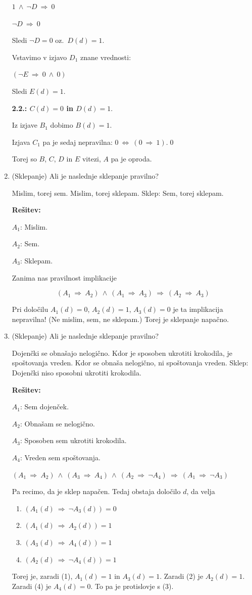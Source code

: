 \documentclass[11pt,paper=b5,footinclude,headinclude]{scrbook} %
\def\inn {{~\wedge~}}
\def\sledi {{~\Rightarrow~}}
\def\cee {{~\Leftrightarrow~}}
\theoremstyle{remark}
\theoremstyle{definition} %
\theoremstyle{theorem} %
\begin{document}
\begin{enumerate}
$1 \inn \neg D\sledi 0$

$\neg D\sledi 0$

Sledi $\neg D = 0$ oz.~$D(d) = 1$.

Vstavimo v izjavo $D_1$ znane vrednosti:

$(\neg E \sledi 0 \inn 0)$

Sledi $E(d) = 1$.

\bigskip

\textbf{2.2.: $C(d) = 0$ in $D(d) = 1$}.

Iz izjave $B_1$ dobimo $B(d) = 1$.

Izjava $C_1$ pa je sedaj nepravilna:
$0 \cee (0\sledi 1)$.\qed

Torej so $B$, $C$, $D$ in $E$ vitezi, $A$ pa je oproda.


\bigskip
\item (Sklepanje)
Ali je naslednje sklepanje pravilno?

Mislim, torej sem. Mislim, torej sklepam. Sklep: Sem, torej sklepam.


\textbf{Rešitev:}

$A_1$: Mislim.

$A_2$: Sem.

$A_3$: Sklepam.

Zanima nas pravilnost implikacije

$$(A_1\sledi A_2)\inn(A_1\sledi A_3)\sledi(A_2\sledi A_3)$$

Pri določilu $A_1(d) = 0$, $A_2(d) = 1$, $A_3(d) = 0$ je ta implikacija nepravilna!
(Ne mislim, sem, ne sklepam.)
Torej je sklepanje napačno.

\bigskip

\item (Sklepanje)
Ali je naslednje sklepanje pravilno?

Dojenčki se obnašajo nelogično. Kdor je sposoben ukrotiti krokodila, je spoštovanja vreden.
Kdor se obnaša nelogično, ni spoštovanja vreden. Sklep: Dojenčki niso sposobni ukrotiti krokodila.


\textbf{Rešitev:}

$A_1$: Sem dojenček.

$A_2$: Obnašam se nelogično.

$A_3$: Sposoben sem ukrotiti krokodila.

$A_4$: Vreden sem spoštovanja.

$(A_1\sledi A_2)\inn (A_3\sledi A_4) \inn (A_2\sledi \neg A_4)\sledi (A_1\sledi \neg A_3)$

Pa recimo, da je sklep napačen. Tedaj obstaja določilo $d$, da velja
\begin{enumerate}[(1)]
  \item $(A_1(d)\sledi \neg A_3(d)) = 0$
  \item $(A_1(d)\sledi A_2(d)) = 1$
  \item $(A_3(d)\sledi A_4(d)) = 1$
  \item $(A_2(d)\sledi \neg A_4(d)) = 1$
\end{enumerate}
Torej je, zaradi (1), $A_1(d) = 1$ in $A_3(d) = 1$. Zaradi (2) je $A_2(d) = 1$.
Zaradi (4) je $A_4(d) = 0$. To pa je protislovje s (3).


\end{enumerate}
\end{document}
